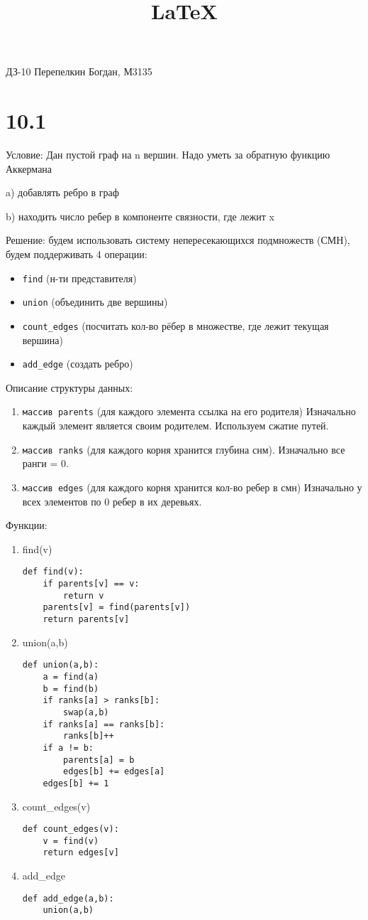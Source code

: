 \documentclass[12pt]{article}
\title{\LaTeX}
\date{}
\author{}
\begin{document}
  

\title{}
ДЗ-10 Перепелкин Богдан, М3135

\section{10.1}

Условие: Дан пустой граф на n вершин. Надо уметь за обратную функцию Аккермана

a) добавлять ребро в граф

b) находить число ребер в компоненте связности, где лежит x

Решение: будем использовать систему непересекающихся подмножеств (СМН), будем
поддерживать 4 операции: 
\begin{itemize}
    \item \texttt{find} (н-ти представителя)
    \item \texttt{union} (объединить две вершины)
    \item \texttt{count\_edges} (посчитать кол-во рёбер в множестве, где лежит текущая вершина)
    \item \texttt{add\_edge} (создать ребро)
\end{itemize}

Описание структуры данных:
\begin{enumerate}
    \item \texttt{массив parents} (для каждого элемента ссылка на его родителя)
Изначально каждый элемент является своим родителем. Используем сжатие путей.
    \item \texttt{массив ranks} (для каждого корня хранится глубина снм).
Изначально все ранги = 0.
    \item \texttt{массив edges} (для каждого корня хранится кол-во ребер в смн)
Изначально у всех элементов по 0 ребер в их деревьях.
\end{enumerate}

Функции:
\begin{enumerate}
    \item find(v)
\begin{lstlisting}
def find(v):
    if parents[v] == v:
        return v
    parents[v] = find(parents[v])
    return parents[v]
\end{lstlisting}
    \item union(a,b)
\begin{lstlisting}
def union(a,b):
    a = find(a)
    b = find(b)
    if ranks[a] > ranks[b]:
        swap(a,b)
    if ranks[a] == ranks[b]:
        ranks[b]++
    if a != b:
        parents[a] = b
        edges[b] += edges[a]
    edges[b] += 1
\end{lstlisting}
    \item count\_edges(v)
\begin{lstlisting}
def count_edges(v):
    v = find(v)
    return edges[v]
\end{lstlisting}
    \item add\_edge
\begin{lstlisting}
def add_edge(a,b):
    union(a,b)
\end{lstlisting}
\end{enumerate}
\end{document}
